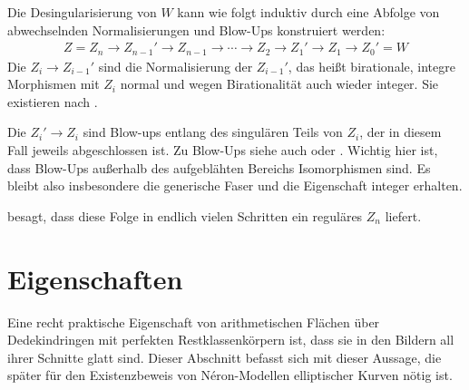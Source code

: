 \begin{Bemerkung}\label{bem:konstruktioneigmodell}
  Die Desingularisierung von $W$ kann wie folgt induktiv durch
  eine Abfolge von abwechselnden Normalisierungen und Blow-Ups
  konstruiert werden:
  \begin{gather*}
    Z=Z_{n}\to Z_{n-1}'\to Z_{n-1}\to\dotsb
    \to Z_{2}\to Z_{1}'\to Z_{1}\to Z_{0}'=W
  \end{gather*}
  Die $Z_i\to Z_{i-1}'$ sind die Normalisierung der $Z_{i-1}'$,
  das heißt birationale, integre Morphismen mit $Z_{i}$ normal
  und wegen Birationalität auch wieder integer. Sie existieren nach
  \cite[Proposition~4.1.22]{liu}.
  
  Die $Z_{i}'\to Z_{i}$ sind Blow-ups entlang des singulären Teils von
  $Z_{i}$, der in diesem Fall jeweils abgeschlossen ist.
  Zu Blow-Ups siehe auch
  \cite[Chapter~8.1]{liu} oder \cite[Chapter~13.19]{wedhorn}.
  Wichtig hier ist, dass Blow-Ups außerhalb des aufgeblähten Bereichs
  Isomorphismen sind. Es bleibt also insbesondere die generische Faser
  und die Eigenschaft integer erhalten.

  \cite[Corollary~8.3.51]{liu} besagt, dass diese Folge in endlich
  vielen Schritten ein reguläres $Z_{n}$ liefert.
\end{Bemerkung}

\section{Eigenschaften}
Eine recht praktische Eigenschaft von arithmetischen Flächen über
Dedekindringen mit perfekten Restklassenkörpern ist, dass
sie in den Bildern all ihrer Schnitte glatt sind.
Dieser Abschnitt befasst sich mit dieser Aussage, die später für
den Existenzbeweis von Néron-Modellen elliptischer Kurven nötig
ist.

